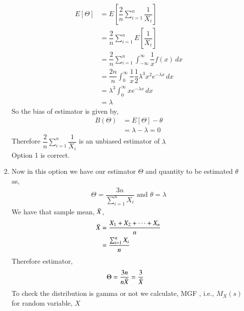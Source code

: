 \documentclass[journal,12pt,twocolumn]{IEEEtran}
\theoremstyle{definition}
\begin{document}
\begin{enumerate}
\begin{align}
    E[\Theta ] &= E  \left[   \dfrac{2}{n} \sum_{i=1}^{n} \dfrac{1}{X_i}  \right] \\
    & = \dfrac{2}{n} \sum_{i=1}^{n} E  \left[ \dfrac{1}{X_i}  \right] \\
 & =  \dfrac{2}{n} \sum_{i=1}^{n} \int_{-\infty}^{\infty} \dfrac{1}{x} f(x)\,dx \\
    \label{eq1}
   & = \dfrac{2n}{n} \int_{0}^{\infty} \dfrac{1}{x} \dfrac{1}{2} \lambda^3x^2e^{-\lambda x}\,dx \\
    & = \lambda^3  \int_{0}^{\infty}  x e^{-\lambda x}\,dx \\
    &= \lambda
\end{align}
So the bias of estimator is given by,
\begin{align}
    B(\Theta) &= E[\Theta] - \theta  \\
    &= \lambda - \lambda = 0
\end{align}
Therefore $\dfrac{2}{n} \sum_{i=1}^{n} \dfrac{1}{X_i} $ is an unbiased estimator of $ \lambda$ \\
Option 1 is correct. \\
\item
 Now in this option we have our estimator $ \Theta$ and quantity to be estimated $ \theta $ as,
 \begin{align}
     \Theta = \dfrac{3n}{\sum_{i=1}^{n} X_i } \text{  and  }
     \theta = \lambda
 \end{align}
We have that sample mean, $ \Bar{X}$,
\begin{align}
    \Bar{X} &= \dfrac{X_1+X_2+ \cdots +X_n}{n} \\
    & = \dfrac{\sum_{i=1}^{n} X_i}{n}
\end{align}
Therefore estimator,
\begin{align}
    \Theta &= \dfrac{3n}{n \Bar{X}} 
    = \dfrac{3}{ \Bar{X}} 
    \label{xbar}
\end{align}
To check the distribution is gamma or not we calculate, MGF , i.e., $ M_X(s) $ for random variable, $ X $


\end{enumerate}
\end{document}
